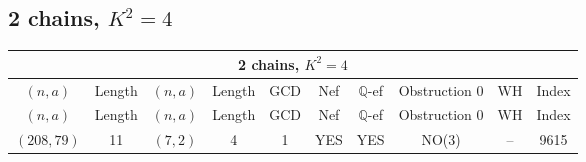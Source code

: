 \subsection{2 chains, $K^2 = 4$}
\begin{longtable}{|c|c|c|c|c|c|c|c|c|c|}
\hline
\multicolumn{10}{|c|}{2 chains, $K^2 = 4$}\\
\hline
$(n,a)$ & Length & $(n,a)$ & Length & GCD & Nef & $\mathbb Q$-ef & Obstruction 0 & WH & Index\\
\hline
\endfirsthead

\hline
$(n,a)$ & Length & $(n,a)$ & Length & GCD & Nef & $\mathbb Q$-ef & Obstruction 0 & WH & Index\\
\hline
\endhead
\hline
\endfoot

$(208, 79)$ & 11 & $(7, 2)$ & 4 & 1 & YES & YES & NO(3) & -- & 9615
\end{longtable}
